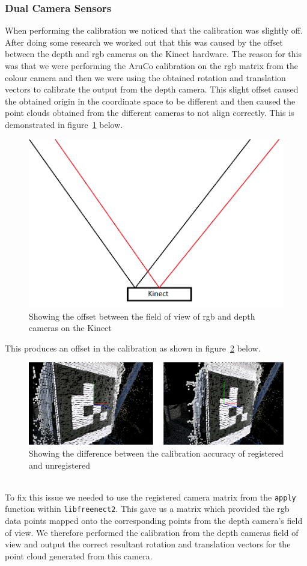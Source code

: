 \documentclass{article}
\begin{document}
\subsubsection{Dual Camera Sensors}
When performing the calibration we noticed that the calibration was slightly off. After doing some research we worked out that this was caused by the offset between the depth and rgb cameras on the Kinect hardware. The reason for this was that we were performing the AruCo calibration on the rgb matrix from the colour camera and then we were using the obtained rotation and translation vectors to calibrate the output from the depth camera. This slight offset caused the obtained origin in the coordinate space to be different and then caused the point clouds obtained from the different cameras to not align correctly. This is demonstrated in figure~\ref{fig:rgbdepth} below.
\begin{figure}[h]
  \centering
  \includegraphics[scale=0.4]{rgbdepth}
  \caption{Showing the offset between the field of view of rgb and depth cameras on the Kinect}
  \label{fig:rgbdepth}
\end{figure}
This produces an offset in the calibration as shown in figure~\ref{fig:calibrationoffset} below.
\\
\begin{figure}[h]
  \centering
  \includegraphics[scale=0.26]{registeredunregisteredpointcloud}
  \caption{Showing the difference between the calibration accuracy of registered and unregistered}
  \label{fig:calibrationoffset}
\end{figure}
\\
To fix this issue we needed to use the registered camera matrix from the \texttt{apply} function within \texttt{libfreenect2}. This gave us a matrix which provided the rgb data points mapped onto the corresponding points from the depth camera's field of view. We therefore performed the calibration from the depth cameras field of view and output the correct resultant rotation and translation vectors for the point cloud generated from this camera.
\newpage
\end{document}
